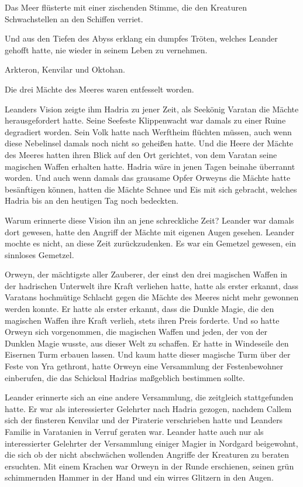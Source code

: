 \documentclass[10pt, a4paper, oneside]{book}
\begin{document}
Das Meer flüsterte mit einer zischenden Stimme, die den Kreaturen Schwachstellen an den Schiffen verriet.

Und aus den Tiefen des Abyss erklang ein dumpfes Tröten, welches Leander gehofft hatte, nie wieder in seinem Leben zu vernehmen.

Arkteron, Kenvilar und Oktohan.

Die drei Mächte des Meeres waren entfesselt worden.

Leanders Vision zeigte ihm Hadria zu jener Zeit, als Seekönig Varatan die Mächte herausgefordert hatte. Seine Seefeste Klippenwacht war damals zu einer Ruine degradiert worden. Sein Volk hatte nach Werftheim flüchten müssen, auch wenn diese Nebelinsel damals noch nicht so geheißen hatte. Und die Heere der Mächte des Meeres hatten ihren Blick auf den Ort gerichtet, von dem Varatan seine magischen Waffen erhalten hatte. Hadria wäre in jenen Tagen beinahe überrannt worden. Und auch wenn damals das grausame Opfer Orweyns die Mächte hatte besänftigen können, hatten die Mächte Schnee und Eis mit sich gebracht, welches Hadria bis an den heutigen Tag noch bedeckten.

Warum erinnerte diese Vision ihn an jene schreckliche Zeit? Leander war damals dort gewesen, hatte den Angriff der Mächte mit eigenen Augen gesehen. Leander mochte es nicht, an diese Zeit zurückzudenken. Es war ein Gemetzel gewesen, ein sinnloses Gemetzel.

Orweyn, der mächtigste aller Zauberer, der einst den drei magischen Waffen in der hadrischen Unterwelt ihre Kraft verliehen hatte, hatte als erster erkannt, dass Varatans hochmütige Schlacht gegen die Mächte des Meeres nicht mehr gewonnen werden konnte. Er hatte als erster erkannt, dass die Dunkle Magie, die den magischen Waffen ihre Kraft verlieh, stets ihren Preis forderte. Und so hatte Orweyn sich vorgenommen, die magischen Waffen und jeden, der von der Dunklen Magie wusste, aus dieser Welt zu schaffen. Er hatte in Windeseile den Eisernen Turm erbauen lassen. Und kaum hatte dieser magische Turm über der Feste von Yra gethront, hatte Orweyn eine Versammlung der Festenbewohner einberufen, die das Schicksal Hadrias maßgeblich bestimmen sollte.

Leander erinnerte sich an eine andere Versammlung, die zeitgleich stattgefunden hatte. Er war als interessierter Gelehrter nach Hadria gezogen, nachdem Callem sich der finsteren Kenvilar und der Piraterie verschrieben hatte und Leanders Familie in Varatanien in Verruf geraten war. Leander hatte auch nur als interessierter Gelehrter der Versammlung einiger Magier in Nordgard beigewohnt, die sich ob der nicht abschwächen wollenden Angriffe der Kreaturen zu beraten ersuchten. Mit einem Krachen war Orweyn in der Runde erschienen, seinen grün schimmernden Hammer in der Hand und ein wirres Glitzern in den Augen.
\end{document}

